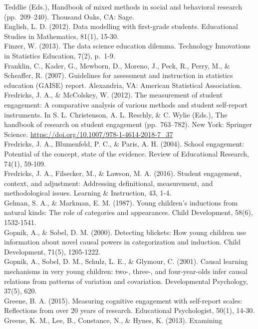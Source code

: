 \documentclass[]{msu-thesis}
\theoremstyle{definition}
\theoremstyle{definition}
\theoremstyle{definition}
\theoremstyle{remark}
\begin{document}
Teddlie (Eds.), Handbook of mixed methods in social and behavioral
research (pp.~209--240). Thousand Oaks, CA: Sage.\\
English, L. D. (2012). Data modelling with first-grade students.
Educational Studies in Mathematics, 81(1), 15-30.\\
Finzer, W. (2013). The data science education dilemma. Technology
Innovations in Statistics Education, 7(2), p.~1-9.\\
Franklin, C., Kader, G., Mewborn, D., Moreno, J., Peck, R., Perry, M.,
\& Scheaffer, R. (2007). Guidelines for assessment and instruction in
statistics education (GAISE) report. Alexandria, VA: American
Statistical Association.\\
Fredricks, J. A., \& McColskey, W. (2012). The measurement of student
engagement: A comparative analysis of various methods and student
self-report instruments. In S. L. Christenson, A. L. Reschly, \& C.
Wylie (Eds.), The handbook of research on student engagement
(pp.~763--782). New York: Springer Science.
\url{https://doi.org/10.1007/978-1-4614-2018-7_37}\\
Fredricks, J. A., Blumenfeld, P. C., \& Paris, A. H. (2004). School
engagement: Potential of the concept, state of the evidence. Review of
Educational Research, 74(1), 59-109.\\
Fredricks, J. A., Filsecker, M., \& Lawson, M. A. (2016). Student
engagement, context, and adjustment: Addressing definitional,
measurement, and methodological issues. Learning \& Instruction, 43,
1-4.\\
Gelman, S. A., \& Markman, E. M. (1987). Young children's inductions
from natural kinds: The role of categories and appearances. Child
Development, 58(6), 1532-1541.\\
Gopnik, A., \& Sobel, D. M. (2000). Detecting blickets: How young
children use information about novel causal powers in categorization and
induction. Child Development, 71(5), 1205-1222.\\
Gopnik, A., Sobel, D. M., Schulz, L. E., \& Glymour, C. (2001). Causal
learning mechanisms in very young children: two-, three-, and
four-year-olds infer causal relations from patterns of variation and
covariation. Developmental Psychology, 37(5), 620.\\
Greene, B. A. (2015). Measuring cognitive engagement with self-report
scales: Reflections from over 20 years of research. Educational
Psychologist, 50(1), 14-30.\\
Greene, K. M., Lee, B., Constance, N., \& Hynes, K. (2013). Examining
\end{document}
